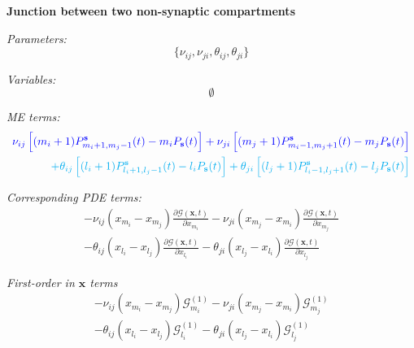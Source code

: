 \documentclass[a4paper, 11pt]{article}
\begin{document}
              {\bf Junction between two non-synaptic compartments}
              
              {\it Parameters:}
              \begin{equation*}
                \{\nu_{ij}, \nu_{ji}, \theta_{ij}, \theta_{ji}\}
              \end{equation*}

              {\it Variables:}
              \begin{equation*}
                \emptyset
              \end{equation*}

              
              {\it ME terms:}
              \begin{equation}
                \begin{split}
                  \textcolor{blue}{\nu_{ij}\left[(m_i+1)P_{m_i+1, m_j-1}^{\mathbf s}(t) - m_iP_{\mathbf s}(t)\right] + \nu_{ji}\left[(m_j+1)P_{m_i-1, m_j+1}^{\mathbf s}(t) - m_jP_{\mathbf s}(t)\right]}\\
                  \textcolor{cyan}{+ \theta_{ij}\left[(l_i+1)P_{l_i+1, l_j-1}^{\mathbf s}(t) - l_iP_{\mathbf s}(t)\right] + \theta_{ji}\left[(l_j+1)P_{l_i-1, l_j+1}^{\mathbf s}(t) - l_jP_{\mathbf s}(t)\right]}
                \end{split}
              \end{equation}
              
              {\it Corresponding PDE terms:}
              \begin{equation}
                \begin{split}
                  -\nu_{ij}(x_{m_i}-x_{m_j})\frac{\partial\mathcal G(\mathbf x, t)}{\partial x_{m_i}} - \nu_{ji}(x_{m_j}-x_{m_i})\frac{\partial\mathcal G(\mathbf x, t)}{\partial x_{m_j}}\\
                  -\theta_{ij}(x_{l_i}-x_{l_j})\frac{\partial\mathcal G(\mathbf x, t)}{\partial x_{l_i}} - \theta_{ji}(x_{l_j}-x_{l_i})\frac{\partial\mathcal G(\mathbf x, t)}{\partial x_{l_j}}
                \end{split}
              \end{equation}

              {\it First-order in $\mathbf x$ terms}
              \begin{equation}
                \begin{split}
                  -\nu_{ij}(x_{m_i}-x_{m_j})\mathcal G^{(1)}_{m_i} - \nu_{ji}(x_{m_j}-x_{m_i})\mathcal G^{(1)}_{m_j}\\
                  -\theta_{ij}(x_{l_i}-x_{l_j})\mathcal G^{(1)}_{l_i} - \theta_{ji}(x_{l_j}-x_{l_i})\mathcal G^{(1)}_{l_j}
                \end{split}
              \end{equation}
              
\end{document}
